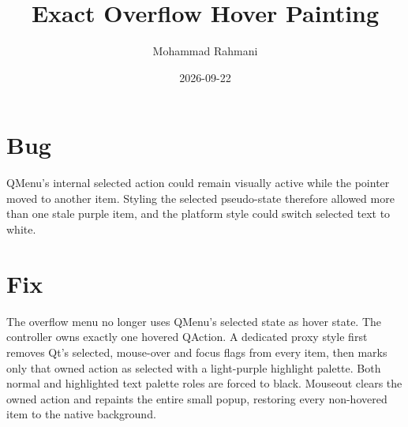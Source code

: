 \documentclass[a4paper]{article}
\title{Exact Overflow Hover Painting}
\date{2026-09-22}
\author{Mohammad Rahmani}
\begin{document}
   \maketitle

   \begin{preview}
      \section{Bug}
      QMenu's internal selected action could remain visually active while the
      pointer moved to another item. Styling the selected pseudo-state therefore
      allowed more than one stale purple item, and the platform style could
      switch selected text to white.

      \section{Fix}
      The overflow menu no longer uses QMenu's selected state as hover state.
      The controller owns exactly one hovered QAction. A dedicated proxy style
      first removes Qt's selected, mouse-over and focus flags from every item,
      then marks only that owned action as selected with a light-purple
      highlight palette. Both normal and highlighted text palette roles are
      forced to black. Mouseout clears the owned action and repaints the entire
      small popup, restoring every non-hovered item to the native background.
   \end{preview}

   
   
\end{document}

